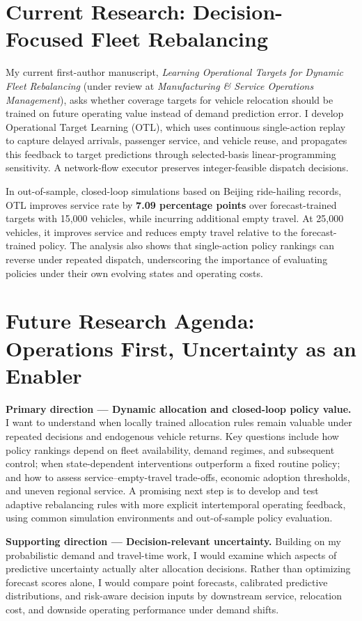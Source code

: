\documentclass[11pt]{article}
\begin{document}
\section*{Current Research: Decision-Focused Fleet Rebalancing}
My current first-author manuscript, \emph{Learning Operational Targets for Dynamic Fleet Rebalancing} (under review at \emph{Manufacturing \& Service Operations Management}), asks whether coverage targets for vehicle relocation should be trained on future operating value instead of demand prediction error. I develop Operational Target Learning (OTL), which uses continuous single-action replay to capture delayed arrivals, passenger service, and vehicle reuse, and propagates this feedback to target predictions through selected-basis linear-programming sensitivity. A network-flow executor preserves integer-feasible dispatch decisions.

In out-of-sample, closed-loop simulations based on Beijing ride-hailing records, OTL improves service rate by \textbf{7.09 percentage points} over forecast-trained targets with 15,000 vehicles, while incurring additional empty travel. At 25,000 vehicles, it improves service and reduces empty travel relative to the forecast-trained policy. The analysis also shows that single-action policy rankings can reverse under repeated dispatch, underscoring the importance of evaluating policies under their own evolving states and operating costs.

\section*{Future Research Agenda: Operations First, Uncertainty as an Enabler}
\textbf{Primary direction --- Dynamic allocation and closed-loop policy value.} I want to understand when locally trained allocation rules remain valuable under repeated decisions and endogenous vehicle returns. Key questions include how policy rankings depend on fleet availability, demand regimes, and subsequent control; when state-dependent interventions outperform a fixed routine policy; and how to assess service--empty-travel trade-offs, economic adoption thresholds, and uneven regional service. A promising next step is to develop and test adaptive rebalancing rules with more explicit intertemporal operating feedback, using common simulation environments and out-of-sample policy evaluation.

\textbf{Supporting direction --- Decision-relevant uncertainty.} Building on my probabilistic demand and travel-time work, I would examine which aspects of predictive uncertainty actually alter allocation decisions. Rather than optimizing forecast scores alone, I would compare point forecasts, calibrated predictive distributions, and risk-aware decision inputs by downstream service, relocation cost, and downside operating performance under demand shifts.
\end{document}
